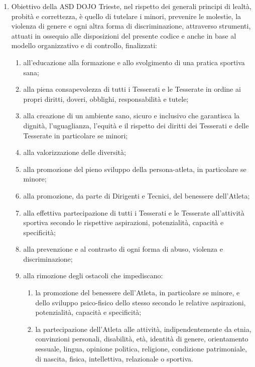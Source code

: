 \documentclass{djtsdoc}
\begin{document}
	\begin{enumerate}
		\item Obiettivo della ASD DOJO Trieste, nel rispetto dei generali principi di lealtà, probità e correttezza, è quello di tutelare i minori, prevenire le molestie, la violenza di genere e ogni altra forma di discriminazione, attraverso strumenti, attuati in ossequio alle disposizioni del presente codice e anche in base al modello organizzativo e di controllo, finalizzati:
		\begin{enumerate}
			\item all'educazione alla formazione e allo svolgimento di una pratica sportiva sana;
			\item alla piena consapevolezza di tutti i Tesserati e le Tesserate in ordine ai propri diritti, doveri,	obblighi, responsabilità e tutele;
			\item alla creazione di un ambiente sano, sicuro e inclusivo che garantisca la dignità,	l'uguaglianza, l'equità e il rispetto dei diritti dei Tesserati e delle Tesserate in particolare se	minori;
			\item alla valorizzazione delle diversità;
			\item alla promozione del pieno sviluppo della persona-atleta, in particolare se minore;
			\item alla promozione, da parte di Dirigenti e Tecnici, del benessere dell'Atleta;
			\item alla effettiva partecipazione di tutti i Tesserati e le Tesserate all'attività sportiva secondo le rispettive aspirazioni, potenzialità, capacità e specificità;
			\item alla prevenzione e al contrasto di ogni forma di abuso, violenza e discriminazione;
			\item alla rimozione degli ostacoli che impediscano:
			\begin{enumerate}
				\item la promozione del benessere dell'Atleta, in particolare se minore, e dello sviluppo 	psico-fisico dello stesso secondo le relative aspirazioni, potenzialità, capacità e specificità;
				\item la partecipazione dell'Atleta alle attività, indipendentemente da etnia, convinzioni personali, disabilità, età, identità di genere, orientamento sessuale, lingua, opinione politica, religione, condizione patrimoniale, di nascita, fisica, intellettiva, relazionale o sportiva.
			\end{enumerate}
		\end{enumerate}
	\end{enumerate}
	
\end{document}
